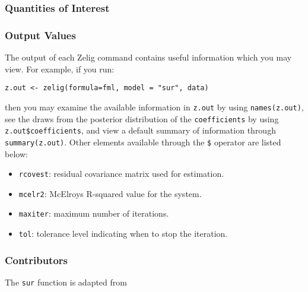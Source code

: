 \subsubsection{Quantities of Interest}
\subsubsection{Output Values}
The output of each Zelig command contains useful information which you may
view. For example, if you run:
\begin{verbatim}
z.out <- zelig(formula=fml, model = "sur", data)
\end{verbatim}
\noindent then you may examine the available information in \texttt{z.out} by
using \texttt{names(z.out)}, see the draws from the posterior distribution of
the \texttt{coefficients} by using \texttt{z.out\$coefficients}, and view a default
summary of information through \texttt{summary(z.out)}. Other elements
available through the \texttt{\$} operator are listed below:
\begin{itemize}
\item \texttt{rcovest}: residual covariance matrix used for estimation.
\item \texttt{mcelr2}: McElroys R-squared value for the system.
\end{itemize}

\begin{itemize}
\item \texttt{maxiter}: maximum number of iterations.
\item \texttt{tol}: tolerance level indicating when to stop the iteration.
\end{itemize}
\subsubsection{Contributors}
The \texttt{sur} function is adapted from 


